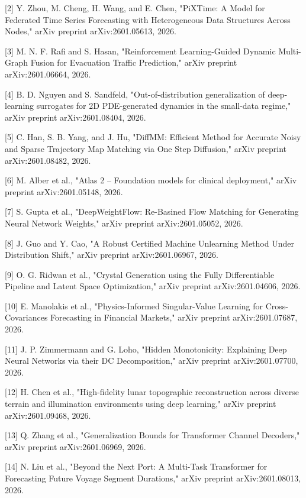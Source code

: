         [2] Y. Zhou, M. Cheng, H. Wang, and E. Chen, "PiXTime: A Model for Federated Time Series Forecasting with Heterogeneous Data Structures Across Nodes," arXiv preprint arXiv:2601.05613, 2026.

        [3] M. N. F. Rafi and S. Hasan, "Reinforcement Learning-Guided Dynamic Multi-Graph Fusion for Evacuation Traffic Prediction," arXiv preprint arXiv:2601.06664, 2026.

        [4] B. D. Nguyen and S. Sandfeld, "Out-of-distribution generalization of deep-learning surrogates for 2D PDE-generated dynamics in the small-data regime," arXiv preprint arXiv:2601.08404, 2026.

        [5] C. Han, S. B. Yang, and J. Hu, "DiffMM: Efficient Method for Accurate Noisy and Sparse Trajectory Map Matching via One Step Diffusion," arXiv preprint arXiv:2601.08482, 2026.

        [6] M. Alber et al., "Atlas 2 -- Foundation models for clinical deployment," arXiv preprint arXiv:2601.05148, 2026.

        [7] S. Gupta et al., "DeepWeightFlow: Re-Basined Flow Matching for Generating Neural Network Weights," arXiv preprint arXiv:2601.05052, 2026.

        [8] J. Guo and Y. Cao, "A Robust Certified Machine Unlearning Method Under Distribution Shift," arXiv preprint arXiv:2601.06967, 2026.

        [9] O. G. Ridwan et al., "Crystal Generation using the Fully Differentiable Pipeline and Latent Space Optimization," arXiv preprint arXiv:2601.04606, 2026.

        [10] E. Manolakis et al., "Physics-Informed Singular-Value Learning for Cross-Covariances Forecasting in Financial Markets," arXiv preprint arXiv:2601.07687, 2026.

        [11] J. P. Zimmermann and G. Loho, "Hidden Monotonicity: Explaining Deep Neural Networks via their DC Decomposition," arXiv preprint arXiv:2601.07700, 2026.

        [12] H. Chen et al., "High-fidelity lunar topographic reconstruction across diverse terrain and illumination environments using deep learning," arXiv preprint arXiv:2601.09468, 2026.

        [13] Q. Zhang et al., "Generalization Bounds for Transformer Channel Decoders," arXiv preprint arXiv:2601.06969, 2026.

        [14] N. Liu et al., "Beyond the Next Port: A Multi-Task Transformer for Forecasting Future Voyage Segment Durations," arXiv preprint arXiv:2601.08013, 2026.

